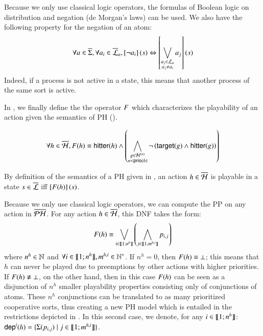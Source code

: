 Because we only use classical logic operators, the formulas of Boolean logic on distribution and negation (de Morgan's laws) can be used.
We also have the following property for the negation of an atom:
\[\forall a \in \overline{\Sigma}, \forall a_i \in \overline{\mathcal{L}}_a, \left[\neg a_i\right](s)
  \Leftrightarrow \left[\bigvee_{\substack{a_j \in \mathcal{L}_a\\a_j \neq a_i}} a_j\right](s)\]
Indeed, if a process is not active in a state, this means that another process of the same sort is active.

In , we finally define the the operator $F$ which characterizes the playability of an action
given the semantics of PH ().
\begin{definition}\label{def:fop}
  $$\forall h \in \overline{\mathcal{H}}, F(h) \equiv \mathsf{hitter}(h) \wedge
    \left( \bigwedge_{\substack{g \in \mathcal{H}^{(n)}\\n < \mathsf{prio}(h)}}
    \neg \left( \mathsf{target}(g) \wedge \mathsf{hitter}(g)\right) \right)$$
\end{definition}

By definition of the semantics of a PH given in ,
an action $h \in \overline{\mathcal{H}}$ is playable in a state $s \in \overline{\mathcal{L}}$ iff $\left[F(h)\right](s)$.




\newcommand{\n}[1][h]{n^{#1}}
\newcommand{\m}[1][h,i]{m^{#1}}

Because we only use classical logic operators, we can compute the PP on any action in $\overline{\mathcal{PH}}$.
For any action $h \in \overline{\mathcal{H}}$, this DNF takes the form:
\[\Fop{h} \equiv \bigvee_{i \in \segm{1}{\n}} \left( \bigwedge_{j \in \segm{1}{\m}} p_{i,j} \right)\]
where $\n \in \sN$ and $\forall i \in \segm{1}{\n}, \m \in \sN^*$.
If $\n = 0$, then $F(h) \equiv \bot$; this means that $h$ can never be played
due to preemptions by other actions with higher priorities.
If $F(h) \not\equiv \bot$, on the other hand, then in this case $F(h)$
can be seen as a disjunction of $\n$ smaller playability properties consisting only of conjunctions of atoms.
These $\n$ conjunctions can be translated to as many prioritized cooperative sorts,
thus creating a new PH model which is entailed in the restrictions depicted in .
In this second case, we denote, for any $i \in \segm{1}{\n}$:
$\PHdep{i}{h} = \{ \PHsort(p_{i,j}) \mid j \in \segm{1}{\m} \}$.

